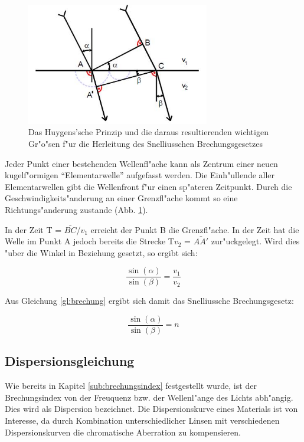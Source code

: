 	\begin{figure}[!h]
		\centering
		\includegraphics[width = 8cm]{img/huygen.jpg}
		\caption{Das Huygens'sche Prinzip und die daraus resultierenden wichtigen Gr"o"sen f"ur die Herleitung des Snelliusschen Brechungsgesetzes \cite{anleitung.}}
		\label{huygen}
	\end{figure}

	Jeder Punkt einer bestehenden Wellenfl"ache kann als Zentrum einer neuen kugelf"ormigen "`Elementarwelle"' aufgefasst werden. Die Einh"ullende aller Elementarwellen gibt die Wellenfront f"ur einen sp"ateren Zeitpunkt. Durch die Geschwindigkeits"anderung an einer Grenzfl"ache kommt so eine Richtungs"anderung zustande (Abb. \ref{huygen}).

	In der Zeit T = $\bar{BC}$/$v_\mathrm{1}$ erreicht der Punkt B die Grenzfl"ache. In der Zeit hat die Welle im Punkt A jedoch bereits die Strecke T$v_\mathrm{2}$ =  $\bar{AA'}$ zur"uckgelegt. Wird dies "uber die Winkel in Beziehung gesetzt, so ergibt sich:

	\begin{equation}
		\frac{\sin(\alpha)}{\sin(\beta)} = \frac{v_\mathrm{1}}{v_\mathrm{2}}  \label{gl:huygen}
	\end{equation}

	Aus Gleichung \eqref{gl:brechung} ergibt sich damit das Snelliussche Brechungsgesetz:

	\begin{equation}
		\frac{\sin(\alpha)}{\sin(\beta)} = n  \label{snellius}
	\end{equation}

	\subsection{Dispersionsgleichung} %
	\label{sub:dispersionsgleichung}
	
	Wie bereits in Kapitel \ref{sub:brechungsindex} festgestellt wurde, ist der Brechungsindex von der Freuquenz bzw. der Wellenl"ange des Lichts abh"angig. Dies wird als Dispersion bezeichnet. Die Dispersionskurve eines Materials ist von Interesse, da durch Kombination unterschiedlicher Linsen mit verschiedenen Dispersionskurven die chromatische Aberration zu kompensieren.

